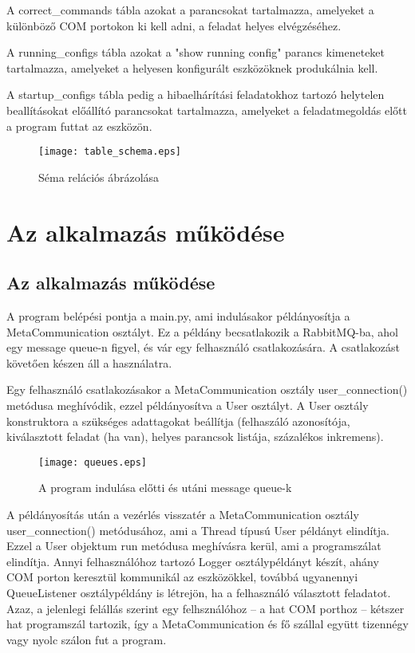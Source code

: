 \documentclass[12pt]{report}
\begin{document}
A correct\_commands tábla azokat a parancsokat tartalmazza, amelyeket a különböző COM portokon ki kell adni, a feladat helyes elvégzéséhez.

A running\_configs tábla azokat a "show running config" parancs kimeneteket tartalmazza, amelyeket a helyesen konfigurált eszközöknek produkálnia kell.


A startup\_configs tábla pedig a hibaelhárítási feladatokhoz tartozó helytelen beallításokat előállító parancsokat tartalmazza, amelyeket a feladatmegoldás előtt a program futtat az eszközön.

\begin{figure}[h]
    \centering
    \texttt{[image: table\_schema.eps]}
    \caption{Séma relációs ábrázolása}
\end{figure}

\chapter{Az alkalmazás működése}
\section{Az alkalmazás működése}


A program belépési pontja a main.py, ami indulásakor példányosítja a MetaCommunication osztályt.
Ez a példány becsatlakozik a RabbitMQ-ba, ahol egy message queue-n figyel, és vár egy felhasználó csatlakozására. A csatlakozást követően készen áll a használatra.

Egy felhasználó csatlakozásakor a MetaCommunication osztály user\_connection() metódusa meghívódik, ezzel példányosítva a User osztályt. A User osztály konstruktora a szükséges adattagokat beállítja (felhaszáló azonosítója, kiválasztott feladat (ha van), helyes parancsok listája, százalékos inkremens).


\begin{figure}[h]
    \centering
    \texttt{[image: queues.eps]}
    \caption{A program indulása előtti és utáni message queue-k}
\end{figure}



A példányosítás után a vezérlés visszatér a MetaCommunication osztály user\_connection() metódusához, ami a Thread típusú User példányt elindítja. Ezzel a User objektum run metódusa meghívásra kerül, ami a programszálat elindítja. Annyi felhasználóhoz tartozó Logger osztálypéldányt készít, ahány COM porton keresztül kommunikál az eszközökkel, továbbá ugyanennyi  QueueListener osztálypéldány is létrejön, ha a felhasználó választott feladatot. Azaz, a jelenlegi felállás szerint egy felhsználóhoz -- a hat COM porthoz -- kétszer hat programszál tartozik, így a MetaCommunication és fő szállal együtt tizennégy vagy nyolc szálon fut a program.
\end{document}
